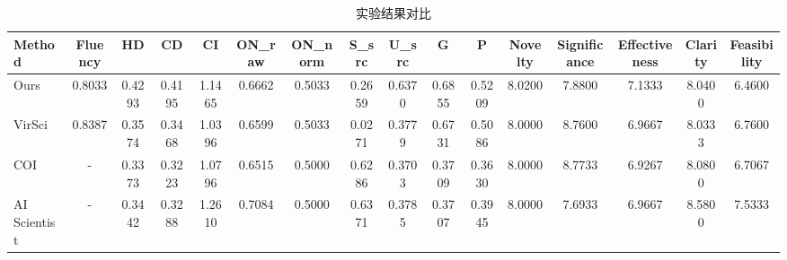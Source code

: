 \begin{table}[htbp]
\centering
\caption{实验结果对比}
\label{tab:results}
\begin{tabular}{lccccccccccccccc}
\toprule
Method & Fluency & HD & CD & CI & ON\_raw & ON\_norm & S\_src & U\_src & G & P & Novelty & Significance & Effectiveness & Clarity & Feasibility \\
\midrule
Ours & 0.8033 & 0.4293 & 0.4195 & 1.1465 & 0.6662 & 0.5033 & 0.2659 & 0.6370 & 0.6855 & 0.5209 & 8.0200 & 7.8800 & 7.1333 & 8.0400 & 6.4600 \\
VirSci & 0.8387 & 0.3574 & 0.3468 & 1.0396 & 0.6599 & 0.5033 & 0.0271 & 0.3779 & 0.6731 & 0.5086 & 8.0000 & 8.7600 & 6.9667 & 8.0333 & 6.7600 \\
COI & - & 0.3373 & 0.3223 & 1.0796 & 0.6515 & 0.5000 & 0.6286 & 0.3703 & 0.3709 & 0.3630 & 8.0000 & 8.7733 & 6.9267 & 8.0800 & 6.7067 \\
AI Scientist & - & 0.3442 & 0.3288 & 1.2610 & 0.7084 & 0.5000 & 0.6371 & 0.3785 & 0.3707 & 0.3945 & 8.0000 & 7.6933 & 6.9667 & 8.5800 & 7.5333 \\
\bottomrule
\end{tabular}
\end{table}
